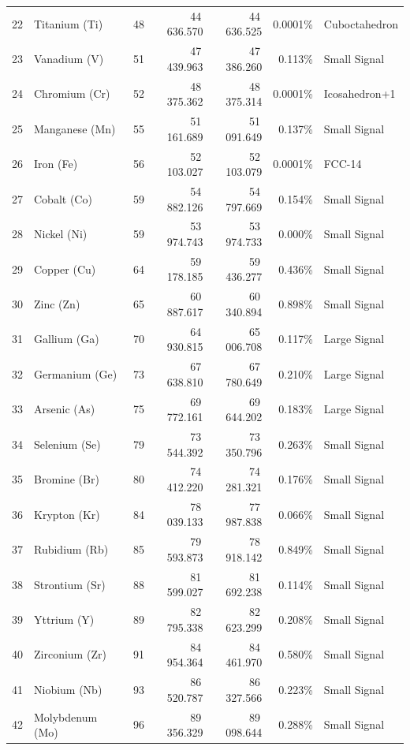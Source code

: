 \begin{footnotesize}
\begin{longtable}{r l r r r r p{3.5cm}}
22 & Titanium (Ti)   & 48 & 44\,636.570 & 44\,636.525 & 0.0001\% & Cuboctahedron \\
23 & Vanadium (V)    & 51 & 47\,439.963 & 47\,386.260 & 0.113\% & Small Signal \\
24 & Chromium (Cr)   & 52 & 48\,375.362 & 48\,375.314 & 0.0001\% & Icosahedron+1 \\
25 & Manganese (Mn)  & 55 & 51\,161.689 & 51\,091.649 & 0.137\% & Small Signal \\
26 & Iron (Fe)       & 56 & 52\,103.027 & 52\,103.079 & 0.0001\% & FCC-14 \\
27 & Cobalt (Co)     & 59 & 54\,882.126 & 54\,797.669 & 0.154\% & Small Signal \\
28 & Nickel (Ni)     & 59 & 53\,974.743 & 53\,974.733 & 0.000\% & Small Signal \\
29 & Copper (Cu)     & 64 & 59\,178.185 & 59\,436.277 & 0.436\% & Small Signal \\
30 & Zinc (Zn)       & 65 & 60\,887.617 & 60\,340.894 & 0.898\% & Small Signal \\
31 & Gallium (Ga)    & 70 & 64\,930.815 & 65\,006.708 & 0.117\% & Large Signal \\
32 & Germanium (Ge)  & 73 & 67\,638.810 & 67\,780.649 & 0.210\% & Large Signal \\
33 & Arsenic (As)    & 75 & 69\,772.161 & 69\,644.202 & 0.183\% & Large Signal \\
34 & Selenium (Se)   & 79 & 73\,544.392 & 73\,350.796 & 0.263\% & Small Signal \\
35 & Bromine (Br)    & 80 & 74\,412.220 & 74\,281.321 & 0.176\% & Small Signal \\
36 & Krypton (Kr)    & 84 & 78\,039.133 & 77\,987.838 & 0.066\% & Small Signal \\
\midrule
37 & Rubidium (Rb)   & 85  & 79\,593.873  & 78\,918.142  & 0.849\% & Small Signal \\
38 & Strontium (Sr)  & 88  & 81\,599.027  & 81\,692.238  & 0.114\% & Small Signal \\
39 & Yttrium (Y)     & 89  & 82\,795.338  & 82\,623.299  & 0.208\% & Small Signal \\
40 & Zirconium (Zr)  & 91  & 84\,954.364  & 84\,461.970  & 0.580\% & Small Signal \\
41 & Niobium (Nb)    & 93  & 86\,520.787  & 86\,327.566  & 0.223\% & Small Signal \\
42 & Molybdenum (Mo) & 96  & 89\,356.329  & 89\,098.644  & 0.288\% & Small Signal \\

\end{longtable}
\end{footnotesize}
